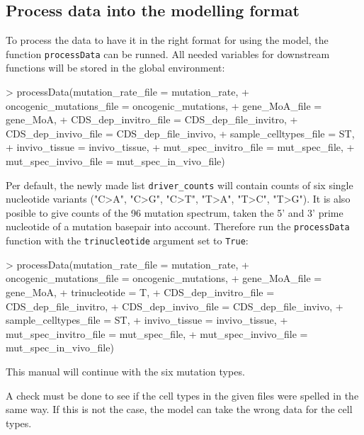 \documentclass{article}
\begin{document}
\subsection{Process data into the modelling format}

To process the data to have it in the right format for using the model, the
function \texttt{processData} can be runned. All needed variables for
downstream functions will be stored in the global environment:

\begin{Schunk}
\begin{Sinput}
> processData(mutation_rate_file = mutation_rate,
+             oncogenic_mutations_file = oncogenic_mutations,
+             gene_MoA_file = gene_MoA,
+             CDS_dep_invitro_file = CDS_dep_file_invitro,
+             CDS_dep_invivo_file = CDS_dep_file_invivo,
+             sample_celltypes_file = ST,
+             invivo_tissue = invivo_tissue,
+             mut_spec_invitro_file = mut_spec_file,
+             mut_spec_invivo_file = mut_spec_in_vivo_file)
\end{Sinput}
\end{Schunk}

Per default, the newly made list \texttt{driver\_counts} will contain counts
of six single nucleotide variants ("C>A", "C>G", "C>T", "T>A", "T>C", "T>G"). 
It is also posible to give counts of the 96 mutation spectrum, taken the 5' and
3' prime nucleotide of a mutation basepair into account. Therefore run the 
\texttt{processData} function with the \texttt{trinucleotide} argument set to 
\texttt{True}:

\begin{Schunk}
\begin{Sinput}
> processData(mutation_rate_file = mutation_rate,
+             oncogenic_mutations_file = oncogenic_mutations,
+             gene_MoA_file = gene_MoA,
+             trinucleotide = T,
+             CDS_dep_invitro_file = CDS_dep_file_invitro,
+             CDS_dep_invivo_file = CDS_dep_file_invivo,
+             sample_celltypes_file = ST,
+             invivo_tissue = invivo_tissue,
+             mut_spec_invitro_file = mut_spec_file,
+             mut_spec_invivo_file = mut_spec_in_vivo_file)
\end{Sinput}
\end{Schunk}

This manual will continue with the six mutation types. 

A check must be done to see if the cell types in the given files were spelled 
in the same way. If this is not the case, the model can take the wrong data
for the cell types. 
\end{document}
